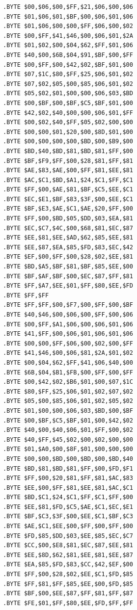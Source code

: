 \begin{minipage}[b]{0.33\linewidth}
\begin{lrbox}{\mybox}%
\begin{lstlisting}[basicstyle=\ttfamily\tiny,escapechar=\%]
.BYTE $00,$06,$00,$FF,$21,$06,$00,$06
.BYTE $01,$06,$01,$BF,$00,$06,$01,$06
.BYTE $01,$06,$00,$00,$FF,$06,$00,$02
.BYTE $00,$FF,$41,$46,$00,$06,$01,$2A
.BYTE $01,$02,$00,$04,$62,$FF,$01,$06
.BYTE $40,$00,$6B,$04,$91,$BF,$00,$FF
.BYTE $00,$FF,$00,$42,$02,$BF,$01,$00
.BYTE $07,$1C,$80,$FF,$25,$06,$01,$02
.BYTE $07,$02,$05,$00,$85,$06,$01,$02
.BYTE $05,$02,$01,$00,$00,$06,$03,$BD
.BYTE $00,$BF,$00,$BF,$C5,$BF,$01,$00
.BYTE $42,$02,$40,$00,$00,$06,$01,$FF
.BYTE $00,$02,$40,$FF,$05,$02,$00,$00
.BYTE $00,$00,$01,$20,$00,$8D,$01,$00
.BYTE $00,$00,$00,$00,$BD,$00,$B9,$00
.BYTE $BD,$40,$BD,$81,$BD,$81,$FF,$00
.BYTE $BF,$F9,$FF,$00,$28,$81,$FF,$81
.BYTE $AE,$83,$AE,$00,$FF,$81,$EE,$81
.BYTE $AC,$C1,$BD,$A1,$24,$C1,$FF,$C1
.BYTE $FF,$00,$AE,$81,$BF,$C5,$EE,$C1
.BYTE $EC,$E1,$BF,$83,$3F,$00,$EE,$C1
.BYTE $BF,$E3,$AE,$C1,$AE,$20,$FF,$00
.BYTE $FF,$00,$BD,$05,$DD,$03,$EA,$81
.BYTE $EC,$C7,$4C,$00,$68,$81,$EC,$87
.BYTE $EE,$81,$EE,$AD,$62,$85,$EE,$81
.BYTE $EE,$87,$EA,$85,$FD,$83,$EC,$42
.BYTE $EF,$00,$FF,$00,$28,$02,$EE,$81
.BYTE $BD,$A5,$BF,$81,$BF,$85,$EE,$00
.BYTE $BF,$AF,$BF,$00,$EC,$87,$FF,$81
.BYTE $FF,$A7,$EE,$01,$FF,$80,$EE,$FD
.BYTE $FF,$FF
.BYTE $FF,$FF,$00,$F7,$00,$FF,$00,$BF
.BYTE $40,$46,$00,$06,$00,$FF,$00,$06
.BYTE $00,$FF,$A1,$06,$00,$06,$01,$06
.BYTE $41,$FF,$00,$06,$01,$06,$01,$06
.BYTE $00,$00,$FF,$06,$00,$02,$00,$FF
.BYTE $41,$46,$00,$06,$81,$2A,$01,$02
.BYTE $00,$04,$62,$FF,$41,$06,$40,$00
.BYTE $6B,$04,$B1,$FB,$00,$FF,$00,$FF
.BYTE $00,$42,$02,$B6,$01,$00,$07,$1C
.BYTE $80,$FF,$25,$06,$01,$02,$07,$02
.BYTE $05,$00,$85,$06,$01,$02,$05,$02
.BYTE $01,$00,$00,$06,$03,$BD,$00,$BF
.BYTE $00,$BF,$C5,$BF,$01,$00,$42,$02
.BYTE $40,$00,$40,$06,$01,$FF,$00,$02
.BYTE $40,$FF,$45,$02,$00,$02,$00,$00
.BYTE $01,$A0,$00,$8F,$01,$00,$00,$00
.BYTE $00,$00,$BD,$00,$BD,$00,$BD,$40
.BYTE $BD,$81,$BD,$81,$FF,$00,$FD,$F1
.BYTE $FF,$00,$20,$81,$FF,$81,$AC,$83
.BYTE $EE,$00,$FF,$81,$EE,$81,$AC,$C1
.BYTE $BD,$C1,$24,$C1,$FF,$C1,$FF,$00
.BYTE $EE,$81,$FD,$C5,$AE,$C1,$EC,$E1
.BYTE $BF,$C3,$3F,$00,$EE,$C1,$BF,$C3
.BYTE $AE,$C1,$EE,$00,$FF,$00,$FF,$00
.BYTE $FD,$85,$DD,$03,$EE,$85,$EC,$C7
.BYTE $CC,$00,$E8,$81,$EC,$87,$EE,$81
.BYTE $EE,$8D,$62,$81,$EE,$81,$EE,$87
.BYTE $EA,$85,$FD,$83,$CC,$42,$EF,$00
.BYTE $FF,$00,$28,$02,$EE,$C1,$FD,$85
.BYTE $FF,$81,$FF,$85,$EE,$00,$FD,$85
.BYTE $BF,$00,$EE,$87,$FF,$81,$FF,$87
.BYTE $FE,$01,$FF,$80,$EE,$FD,$FF,$FF

\end{lstlisting}
\end{lrbox}
\end{minipage}

